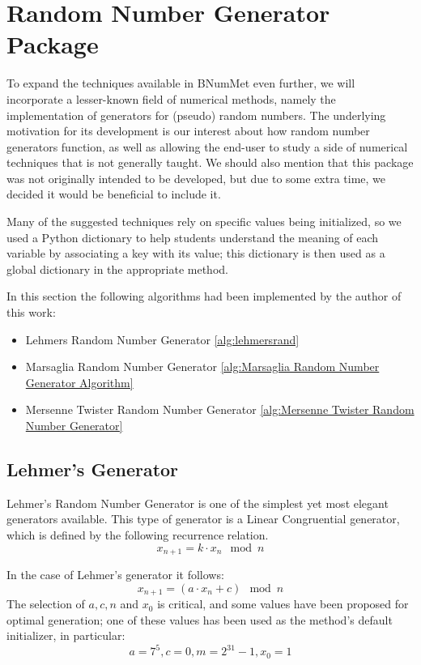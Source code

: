 \section{Random Number Generator Package}
To expand the techniques available in BNumMet even further, we will incorporate a lesser-known field of numerical methods, namely the implementation of generators for (pseudo) random numbers. The underlying motivation for its development is our interest about how random number generators function, as well as allowing the end-user to study a side of numerical techniques that is not generally taught. We should also mention that this package was not originally intended to be developed, but due to some extra time, we decided it would be beneficial to include it.

Many of the suggested techniques rely on specific values being initialized, so we used a Python dictionary to help students understand the meaning of each variable by associating a key with its value; this dictionary is then used as a global dictionary in the appropriate method.

In this section the following algorithms had been implemented by the author of this work:
\begin{itemize}
    \item Lehmers Random Number Generator \ref{alg:lehmersrand}
    \item Marsaglia Random Number Generator \ref{alg:Marsaglia Random Number Generator Algorithm}
    \item Mersenne Twister Random Number Generator \ref{alg:Mersenne Twister Random Number Generator}
\end{itemize}

\subsection{Lehmer's Generator}
Lehmer's Random Number Generator is one of the simplest yet most elegant generators available. This type of generator is a Linear Congruential generator, which is defined by the following recurrence relation. \cite{payne1969coding} \cite{park1988random}
\[x_{n+1} = k\cdot x_n \mod{n}\]

In the case of Lehmer's generator it follows:
\[x_{n+1} = (a\cdot x_n+c) \mod{n}\]
The selection of $a,c,n$ and $x_0$ is critical, and some values have been proposed for optimal generation; one of these values has been used as the method's default initializer, in particular:
\[a= 7^5, c=0, m=2^{31}-1, x_0 = 1 \]

